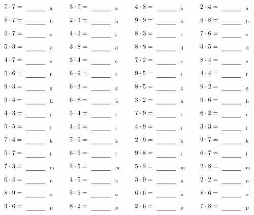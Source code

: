 \documentclass
[
  draft    = true,
  fontsize = 11pt,
  parskip  = half-
]
{scrartcl}
\begin{document}
\par\vfill\par
\begin{align*}
    \pline{7\cdot7}&=\rline{a}
  & \pline{3\cdot7}&=\rline{a}
  & \pline{4\cdot8}&=\rline{a}
  & \pline{2\cdot4}&=\rline{a} \\[1ex]
    \pline{8\cdot7}&=\rline{b}
  & \pline{2\cdot3}&=\rline{b}
  & \pline{9\cdot9}&=\rline{b}
  & \pline{5\cdot8}&=\rline{b} \\[1ex]
    \pline{2\cdot7}&=\rline{c}
  & \pline{4\cdot2}&=\rline{c}
  & \pline{8\cdot3}&=\rline{c}
  & \pline{7\cdot6}&=\rline{c} \\[1ex]
    \pline{5\cdot3}&=\rline{d}
  & \pline{3\cdot8}&=\rline{d}
  & \pline{8\cdot8}&=\rline{d}
  & \pline{3\cdot5}&=\rline{d} \\[1ex]
    \pline{4\cdot7}&=\rline{e}
  & \pline{3\cdot4}&=\rline{e}
  & \pline{7\cdot2}&=\rline{e}
  & \pline{8\cdot4}&=\rline{e} \\[1ex]
    \pline{5\cdot6}&=\rline{f}
  & \pline{6\cdot9}&=\rline{f}
  & \pline{9\cdot5}&=\rline{f}
  & \pline{4\cdot4}&=\rline{f} \\[1ex]
    \pline{9\cdot3}&=\rline{g}
  & \pline{6\cdot3}&=\rline{g}
  & \pline{8\cdot5}&=\rline{g}
  & \pline{9\cdot2}&=\rline{g} \\[1ex]
    \pline{9\cdot4}&=\rline{h}
  & \pline{6\cdot8}&=\rline{h}
  & \pline{3\cdot2}&=\rline{h}
  & \pline{9\cdot6}&=\rline{h} \\[1ex]
    \pline{4\cdot3}&=\rline{i}
  & \pline{5\cdot4}&=\rline{i}
  & \pline{7\cdot9}&=\rline{i}
  & \pline{6\cdot2}&=\rline{i} \\[1ex]
    \pline{5\cdot5}&=\rline{j}
  & \pline{4\cdot6}&=\rline{j}
  & \pline{4\cdot9}&=\rline{j}
  & \pline{3\cdot3}&=\rline{j} \\[1ex]
    \pline{7\cdot4}&=\rline{k}
  & \pline{7\cdot5}&=\rline{k}
  & \pline{2\cdot9}&=\rline{k}
  & \pline{9\cdot7}&=\rline{k} \\[1ex]
    \pline{5\cdot7}&=\rline{l}
  & \pline{6\cdot5}&=\rline{l}
  & \pline{9\cdot8}&=\rline{l}
  & \pline{6\cdot7}&=\rline{l} \\[1ex]
    \pline{7\cdot3}&=\rline{m}
  & \pline{2\cdot5}&=\rline{m}
  & \pline{5\cdot2}&=\rline{m}
  & \pline{2\cdot8}&=\rline{m} \\[1ex]
    \pline{6\cdot4}&=\rline{n}
  & \pline{4\cdot5}&=\rline{n}
  & \pline{3\cdot9}&=\rline{n}
  & \pline{2\cdot2}&=\rline{n} \\[1ex]
    \pline{8\cdot9}&=\rline{o}
  & \pline{5\cdot9}&=\rline{o}
  & \pline{6\cdot6}&=\rline{o}
  & \pline{8\cdot6}&=\rline{o} \\[1ex]
    \pline{3\cdot6}&=\rline{p}
  & \pline{8\cdot2}&=\rline{p}
  & \pline{2\cdot6}&=\rline{p}
  & \pline{7\cdot8}&=\rline{p}
\end{align*}
\end{document}
